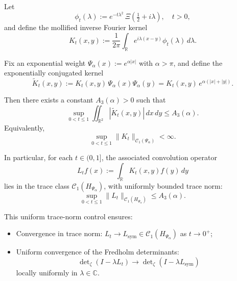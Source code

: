 \begin{lemma}
\label{lem:uniform-L1-conjugated-kernel}
Let
\[
\phi_t(\lambda) := e^{-t\lambda^2} \, \Xi\left( \tfrac{1}{2} + i\lambda \right), \quad t > 0,
\]
and define the mollified inverse Fourier kernel
\[
K_t(x,y) := \frac{1}{2\pi} \int_{\mathbb{R}} e^{i\lambda(x - y)} \phi_t(\lambda) \, d\lambda.
\]

Fix an exponential weight \( \Psi_\alpha(x) := e^{\alpha |x|} \) with \( \alpha > \pi \), and define the exponentially conjugated kernel
\[
\widetilde{K}_t(x,y) := K_t(x,y)\, \Psi_\alpha(x)\Psi_\alpha(y) = K_t(x,y)\, e^{\alpha(|x| + |y|)}.
\]

Then there exists a constant \( A_3(\alpha) > 0 \) such that
\[
\sup_{0 < t \le 1} \iint_{\mathbb{R}^2} |\widetilde{K}_t(x,y)| \, dx\,dy \le A_3(\alpha).
\]
Equivalently,
\[
\sup_{0 < t \le 1} \|K_t\|_{\mathcal{C}_1(\Psi_\alpha)} < \infty.
\]

In particular, for each \( t \in (0,1] \), the associated convolution operator
\[
L_t f(x) := \int_{\mathbb{R}} K_t(x,y) f(y)\, dy
\]
lies in the trace class \( \mathcal{C}_1(H_{\Psi_\alpha}) \), with uniformly bounded trace norm:
\[
\sup_{0 < t \le 1} \|L_t\|_{\mathcal{C}_1(H_{\Psi_\alpha})} \le A_3(\alpha).
\]

\noindent
This uniform trace-norm control ensures:
\begin{itemize}
    \item Convergence in trace norm: \( L_t \to L_{\mathrm{sym}} \in \mathcal{C}_1(H_{\Psi_\alpha}) \) as \( t \to 0^+ \);
    \item Uniform convergence of the Fredholm determinants:
    \[
    \det\nolimits_\zeta(I - \lambda L_t) \to \det\nolimits_\zeta(I - \lambda L_{\mathrm{sym}})
    \]
    locally uniformly in \( \lambda \in \mathbb{C} \).
\end{itemize}
\end{lemma}
